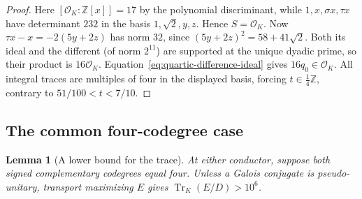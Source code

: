 \documentclass[11pt,reqno]{amsart}
\newtheorem{lemma}[theorem]{Lemma}
\theoremstyle{remark}\newtheorem{remark}[theorem]{Remark}
\numberwithin{equation}{section}
\begin{document}
\begin{proof}
Here $[\mathcal O_K:\mathbb Z[x]]=17$ by the polynomial discriminant,
while $1,x,\sigma x,\tau x$ have determinant $232$ in the
basis $1,\sqrt2,y,z$. Hence $S=\mathcal O_K$.
Now $\tau x-x=-2(5y+2z)$ has norm $32$, since
$(5y+2z)^2=58+41\sqrt2$. Both its ideal and the different (of
norm $2^{11}$) are supported at the unique dyadic prime, so their
product is $16\mathcal O_K$. Equation~\eqref{eq:quartic-difference-ideal}
gives $16q_0\in\mathcal O_K$. All integral traces are multiples of
four in the displayed basis, forcing $t\in\frac14\mathbb Z$,
contrary to $51/100<t<7/10$.
\end{proof}

\subsection{The common four-codegree case}
\begin{lemma}[A lower bound for the trace]\label{thm:half-million}
At either conductor, suppose both signed complementary codegrees equal
four. Unless a Galois conjugate is pseudo-unitary, transport maximizing
$E$ gives $\operatorname{Tr}_K(E/D)>10^6$.
\end{lemma}
\end{document}
